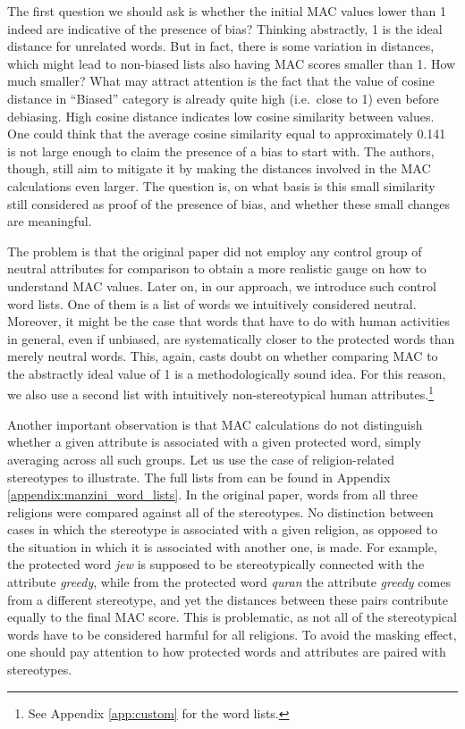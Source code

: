 \documentclass{clv3}
\begin{document}
The first question we should ask is whether the initial \textsf{MAC}
values lower than 1 indeed are indicative of the presence of bias?
Thinking abstractly, 1 is the ideal distance for unrelated words. But in
fact, there is some variation in distances, which might lead to
non-biased lists also having \textsf{MAC} scores smaller than 1. How
much smaller? What may attract attention is the fact that the value of
cosine distance in ``Biased'' category is already quite high (i.e.~close
to 1) even before debiasing. High cosine distance indicates low cosine
similarity between values. One could think that the average cosine
similarity equal to approximately 0.141 is not large enough to claim the
presence of a bias to start with. The authors, though, still aim to
mitigate it by making the distances involved in the \textsf{MAC}
calculations even larger. The question is, on what basis is this small
similarity still considered as proof of the presence of bias, and
whether these small changes are meaningful.

The problem is that the original paper did not employ any control group
of neutral attributes for comparison to obtain a more realistic gauge on
how to understand \textsf{MAC} values. Later on, in our approach, we
introduce such control word lists. One of them is a list of words we
intuitively considered neutral. Moreover, it might be the case that
words that have to do with human activities in general, even if
unbiased, are systematically closer to the protected words than merely
neutral words. This, again, casts doubt on whether comparing
\textsf{MAC} to the abstractly ideal value of 1 is a methodologically
sound idea. For this reason, we also use a second list with intuitively
non-stereotypical human attributes.\footnote{See Appendix
  \ref{app:custom} for the word lists.}

Another important observation is that \textsf{MAC} calculations do not
distinguish whether a given attribute is associated with a given
protected word, simply averaging across all such groups. Let us use the
case of religion-related stereotypes to illustrate. The full lists from
\citep{Manzini2019blackToCriminal} can be found in Appendix \ref{appendix:manzini_word_lists}. In
the original paper, words from all three religions were compared against
all of the stereotypes. No distinction between cases in which the
stereotype is associated with a given religion, as opposed to the
situation in which it is associated with another one, is made. For
example, the protected word \emph{jew} is supposed to be stereotypically
connected with the attribute \emph{greedy}, while from the protected
word \emph{quran} the attribute \emph{greedy} comes from a different
stereotype, and yet the distances between these pairs contribute equally
to the final \textsf{MAC} score. This is problematic, as not all of the
stereotypical words have to be considered harmful for all 
religions. To avoid the masking effect, one should pay attention to how
protected words and attributes are paired with stereotypes.
\end{document}
